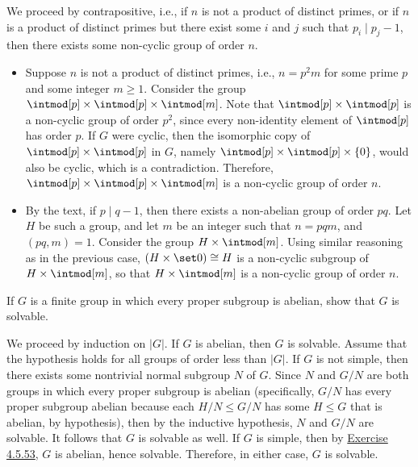 \begin{sol}
	We proceed by contrapositive, i.e., if $n$ is not a product of distinct primes, or if $n$ is a product of distinct primes but there exist some $i$ and $j$ such that $p_i \mid p_j - 1$, then there exists some non-cyclic group of order $n$.
	\begin{itemize}
		\item Suppose $n$ is not a product of distinct primes, i.e., $n = p^2m$ for some prime $p$ and some integer $m \geq 1$. Consider the group $\intmod[p] \times \intmod[p] \times \intmod[m]$. Note that $\intmod[p] \times \intmod[p]$ is a non-cyclic group of order $p^2$, since every non-identity element of $\intmod[p]$ has order $p$. If $G$ were cyclic, then the isomorphic copy of $\intmod[p] \times \intmod[p]$ in $G$, namely $\intmod[p] \times \intmod[p] \times \{0\}$, would also be cyclic, which is a contradiction. Therefore, $\intmod[p] \times \intmod[p] \times \intmod[m]$ is a non-cyclic group of order $n$.
		\item By the text, if $p \mid q - 1$, then there exists a non-abelian group of order $pq$. Let $H$ be such a group, and let $m$ be an integer such that $n = pqm$, and $(pq, m) = 1$. Consider the group $H \times \intmod[m]$. Using similar reasoning as in the previous case, $(H \times \set 0) \cong H$ is a non-cyclic subgroup of $H \times \intmod[m]$, so that $H \times \intmod[m]$ is a non-cyclic group of order $n$. \qh
	\end{itemize}
\end{sol}

\begin{exercise}\label{ex4.5.56}
	If $G$ is a finite group in which every proper subgroup is abelian, show that $G$ is solvable.
\end{exercise}

\begin{sol}
	We proceed by induction on $|G|$. If $G$ is abelian, then $G$ is solvable. Assume that the hypothesis holds for all groups of order less than $|G|$. If $G$ is not simple, then there exists some nontrivial normal subgroup $N$ of $G$. Since $N$ and $G/N$ are both groups in which every proper subgroup is abelian (specifically, $G/N$ has every proper subgroup abelian because each $H/N \leq G/N$ has some $H \leq G$ that is abelian, by hypothesis), then by the inductive hypothesis, $N$ and $G/N$ are solvable. It follows that $G$ is solvable as well. If $G$ is simple, then by \hyperref[ex4.5.53]{Exercise 4.5.53}, $G$ is abelian, hence solvable. Therefore, in either case, $G$ is solvable.
\end{sol}

